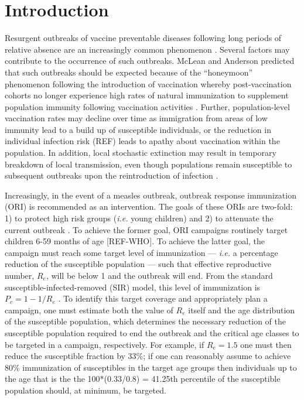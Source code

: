 \section{Introduction}\label{introduction}

Resurgent outbreaks of vaccine preventable diseases following long periods of
relative absence are an increasingly common phenomenon \cite{Hersh_1991, Cherry_2012, Celentano_2005, Shibeshi_2014}. Several factors may contribute to the occurrence of
such outbreaks. McLean and Anderson \cite{McLean_1988} predicted that such
outbreaks should be expected because of the ``honeymoon'' phenomenon
following the introduction of vaccination whereby post-vaccination
cohorts no longer experience high rates of natural immunization to
supplement population immunity following vaccination activities \cite{Jansen_2003}. Further, population-level vaccination rates may
decline over time as immigration from areas of low immunity lead to a build up of susceptible individuals, or the reduction in individual infection risk (REF) leads to apathy about vaccination within the population. In addition, local stochastic
extinction may result in temporary breakdown of local transmission, even
though populations remain susceptible to subsequent outbreaks upon the
reintroduction of infection \cite{Ferrari_2008}.

Increasingly, in the event of a measles outbreak, outbreak response
immunization (ORI) is recommended as an intervention. The goals of
these ORIs are two-fold: 1) to protect high risk groups (\emph{i.e.}
young children) and 2) to attenuate the current outbreak \cite{Cairns_2011,Grais_2011} . To achieve the former goal, ORI campaigns routinely
target children 6-59 months of age [REF-WHO]. To achieve the latter goal, the campaign must reach some
target level of immunization --- \emph{i.e.} a percentage reduction of
the susceptible population --- such that effective reproductive number,
\(R_e\), will be below 1 and the outbreak will end. From the standard susceptible-infected-removed (SIR)
model, this level of immunization is \(P_c = 1-1/R_e\) \cite{Anderson_1981}. To identify this target coverage and appropriately plan a campaign, one must estimate
both the value of \(R_e\) itself and the age distribution of the
susceptible population, which determines the necessary reduction of
the susceptible population required to end the outbreak and the
critical age classes to be targeted in a campaign, respectively.
For example, if \(R_e=1.5\) one must then reduce the
susceptible fraction by 33\%; if one can reasonably assume to achieve
80\% immunization of susceptibles in the target age groups then individuals up to the age that is the the
100*(0.33/0.8) = 41.25th percentile of the susceptible population should, at minimum, be targeted.

